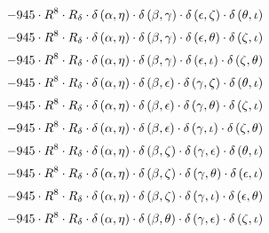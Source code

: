 \begin{subequations}
\begin{gather}
 \\[0.2em] \notag 		 - 945 \cdot R^{8} \cdot R_{\delta{}} \cdot \delta{}\left(\alpha{}, \eta{}\right) \cdot \delta{}\left(\beta{}, \gamma{}\right) \cdot \delta{}\left(\epsilon{}, \zeta{}\right) \cdot \delta{}\left(\theta{}, \iota{}\right) 
 \\[0.2em] \notag 		 - 945 \cdot R^{8} \cdot R_{\delta{}} \cdot \delta{}\left(\alpha{}, \eta{}\right) \cdot \delta{}\left(\beta{}, \gamma{}\right) \cdot \delta{}\left(\epsilon{}, \theta{}\right) \cdot \delta{}\left(\zeta{}, \iota{}\right) 
 \\[0.2em] \notag 		 - 945 \cdot R^{8} \cdot R_{\delta{}} \cdot \delta{}\left(\alpha{}, \eta{}\right) \cdot \delta{}\left(\beta{}, \gamma{}\right) \cdot \delta{}\left(\epsilon{}, \iota{}\right) \cdot \delta{}\left(\zeta{}, \theta{}\right) 
 \\[0.2em] \notag 		 - 945 \cdot R^{8} \cdot R_{\delta{}} \cdot \delta{}\left(\alpha{}, \eta{}\right) \cdot \delta{}\left(\beta{}, \epsilon{}\right) \cdot \delta{}\left(\gamma{}, \zeta{}\right) \cdot \delta{}\left(\theta{}, \iota{}\right) 
 \\[0.2em] \notag 		 - 945 \cdot R^{8} \cdot R_{\delta{}} \cdot \delta{}\left(\alpha{}, \eta{}\right) \cdot \delta{}\left(\beta{}, \epsilon{}\right) \cdot \delta{}\left(\gamma{}, \theta{}\right) \cdot \delta{}\left(\zeta{}, \iota{}\right) 
 \\[0.2em] \notag 		 - 945 \cdot R^{8} \cdot R_{\delta{}} \cdot \delta{}\left(\alpha{}, \eta{}\right) \cdot \delta{}\left(\beta{}, \epsilon{}\right) \cdot \delta{}\left(\gamma{}, \iota{}\right) \cdot \delta{}\left(\zeta{}, \theta{}\right) 
 \\[0.2em] \notag 		 - 945 \cdot R^{8} \cdot R_{\delta{}} \cdot \delta{}\left(\alpha{}, \eta{}\right) \cdot \delta{}\left(\beta{}, \zeta{}\right) \cdot \delta{}\left(\gamma{}, \epsilon{}\right) \cdot \delta{}\left(\theta{}, \iota{}\right) 
 \\[0.2em] \notag 		 - 945 \cdot R^{8} \cdot R_{\delta{}} \cdot \delta{}\left(\alpha{}, \eta{}\right) \cdot \delta{}\left(\beta{}, \zeta{}\right) \cdot \delta{}\left(\gamma{}, \theta{}\right) \cdot \delta{}\left(\epsilon{}, \iota{}\right) 
 \\[0.2em] \notag 		 - 945 \cdot R^{8} \cdot R_{\delta{}} \cdot \delta{}\left(\alpha{}, \eta{}\right) \cdot \delta{}\left(\beta{}, \zeta{}\right) \cdot \delta{}\left(\gamma{}, \iota{}\right) \cdot \delta{}\left(\epsilon{}, \theta{}\right) 
 \\[0.2em] \notag 		 - 945 \cdot R^{8} \cdot R_{\delta{}} \cdot \delta{}\left(\alpha{}, \eta{}\right) \cdot \delta{}\left(\beta{}, \theta{}\right) \cdot \delta{}\left(\gamma{}, \epsilon{}\right) \cdot \delta{}\left(\zeta{}, \iota{}\right) 

\end{gather}
\end{subequations}
